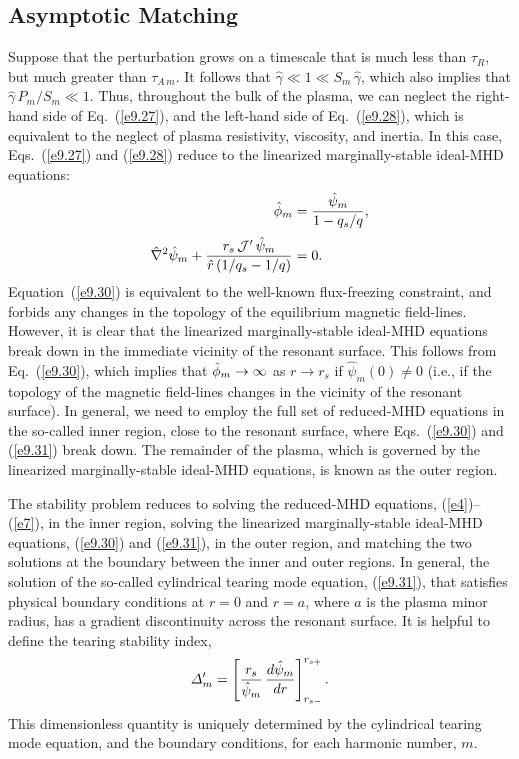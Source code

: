 \documentclass[12pt,prb,aps]{revtex4-1}
\begin{document}
\subsection{Asymptotic Matching}
Suppose that the perturbation   grows on a timescale that is much less than $\tau_R$, but much greater than
$\tau_{A\,m}$. It follows that
$\hat{\gamma} \ll 1 \ll S_m\,\hat{\gamma}$,
which also implies that $\hat{\gamma}\,P_m/S_m\ll 1$. 
Thus, throughout the bulk of the plasma, we can neglect the right-hand side of Eq.~(\ref{e9.27}), and the left-hand side of Eq.~(\ref{e9.28}), which is equivalent to the neglect of plasma resistivity, viscosity,  and inertia. In this case,
Eqs.~(\ref{e9.27}) and (\ref{e9.28}) reduce to the linearized marginally-stable ideal-MHD equations:\cite{fkr}
\begin{align}
\hat{\phi}_m &= \frac{\hat{\psi}_m}{1-q_s/q},\label{e9.30}\\[0.5ex]
\hat{\nabla}^2\hat{\psi}_m + \frac{r_s\,{\cal J}'\,\hat{\psi}_m}{\hat{r}\,(1/q_s-1/q)}&=0
.\label{e9.31}
\end{align}
Equation~(\ref{e9.30}) is equivalent to the well-known flux-freezing constraint,\cite{fried} and forbids any changes in the
topology of the equilibrium magnetic field-lines. 
However, it is clear that the linearized marginally-stable ideal-MHD  equations break down in the
immediate vicinity of the resonant surface. This follows from Eq.~(\ref{e9.30}), which implies that $\skew{3}\hat{\phi}_m\rightarrow\infty$ as $r\rightarrow r_s$ if $\hat{\psi}_m(0)\neq 0$ (i.e., if the topology of the magnetic
field-lines changes in the  vicinity of the resonant surface). 
 In general, we need to employ the full set of reduced-MHD equations in the so-called  inner region, close to the resonant
surface, where Eqs.~(\ref{e9.30}) and (\ref{e9.31}) break down. The remainder of the plasma,
which is governed by the linearized marginally-stable ideal-MHD  equations, is known as the  outer region. 
 
The stability problem reduces to solving the  reduced-MHD equations, (\ref{e4})--(\ref{e7}), in the inner region, solving the linearized marginally-stable ideal-MHD
equations, (\ref{e9.30}) and (\ref{e9.31}), in the outer region, and matching the two solutions at the boundary between the
inner and outer regions.\cite{fkr} In general, the solution of the so-called cylindrical tearing mode equation, (\ref{e9.31}),\cite{rf0} that satisfies
physical boundary conditions at $r=0$ and $r=a$, where $a$ is the plasma minor radius, has a gradient discontinuity across the resonant surface.\cite{fkr} 
 It is helpful to define the tearing stability
index,\cite{fkr} 
\begin{equation}\label{e25}
{\mit\Delta}_m' =\left[\frac{r_s}{\hat{\psi}_m}\,\frac{d\hat{\psi}_m}{dr}\right]_{r_{s-}}^{r_{s+}}.
\end{equation}
This  dimensionless quantity is uniquely determined by the cylindrical tearing mode equation, and the boundary conditions,
for each harmonic number, $m$. 
\end{document}
